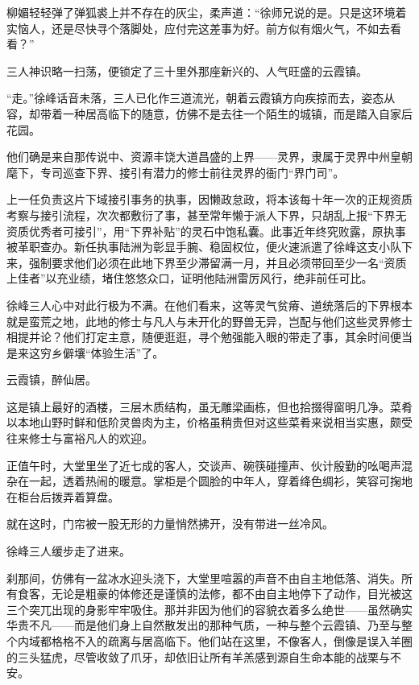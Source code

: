 柳媚轻轻弹了弹狐裘上并不存在的灰尘，柔声道：“徐师兄说的是。只是这环境着实恼人，还是尽快寻个落脚处，应付完这差事为好。前方似有烟火气，不如去看看？”

三人神识略一扫荡，便锁定了三十里外那座新兴的、人气旺盛的云霞镇。

“走。”徐峰话音未落，三人已化作三道流光，朝着云霞镇方向疾掠而去，姿态从容，却带着一种居高临下的随意，仿佛不是去往一个陌生的城镇，而是踏入自家后花园。

他们确是来自那传说中、资源丰饶大道昌盛的上界——灵界，隶属于灵界中州皇朝麾下，专司巡查下界、接引有潜力的修士前往灵界的衙门“界门司”。

上一任负责这片下域接引事务的执事，因懒政怠政，将本该每十年一次的正规资质考察与接引流程，次次都敷衍了事，甚至常年懒于派人下界，只胡乱上报“下界无资质优秀者可接引”，用“下界补贴”的灵石中饱私囊。此事近年终究败露，原执事被革职查办。新任执事陆洲为彰显手腕、稳固权位，便火速派遣了徐峰这支小队下来，强制要求他们必须在此地下界至少滞留满一月，并且必须带回至少一名“资质上佳者”以充业绩，堵住悠悠众口，证明他陆洲雷厉风行，绝非前任可比。

徐峰三人心中对此行极为不满。在他们看来，这等灵气贫瘠、道统落后的下界根本就是蛮荒之地，此地的修士与凡人与未开化的野兽无异，岂配与他们这些灵界修士相提并论？他们打定主意，随便逛逛，寻个勉强能入眼的带走了事，其余时间便当是来这穷乡僻壤“体验生活”了。

\vspace{2em}

云霞镇，醉仙居。

这是镇上最好的酒楼，三层木质结构，虽无雕梁画栋，但也拾掇得窗明几净。菜肴以本地山野时鲜和低阶灵兽肉为主，价格虽稍贵但对这些菜肴来说相当实惠，颇受往来修士与富裕凡人的欢迎。

正值午时，大堂里坐了近七成的客人，交谈声、碗筷碰撞声、伙计殷勤的吆喝声混杂在一起，透着热闹的暖意。掌柜是个圆脸的中年人，穿着绛色绸衫，笑容可掬地在柜台后拨弄着算盘。

就在这时，门帘被一股无形的力量悄然拂开，没有带进一丝冷风。

徐峰三人缓步走了进来。

刹那间，仿佛有一盆冰水迎头浇下，大堂里喧嚣的声音不由自主地低落、消失。所有食客，无论是粗豪的体修还是谨慎的法修，都不由自主地停下了动作，目光被这三个突兀出现的身影牢牢吸住。那并非因为他们的容貌衣着多么绝世——虽然确实华贵不凡——而是他们身上自然散发出的那种气质，一种与整个云霞镇、乃至与整个内域都格格不入的疏离与居高临下。他们站在这里，不像客人，倒像是误入羊圈的三头猛虎，尽管收敛了爪牙，却依旧让所有羊羔感到源自生命本能的战栗与不安。

